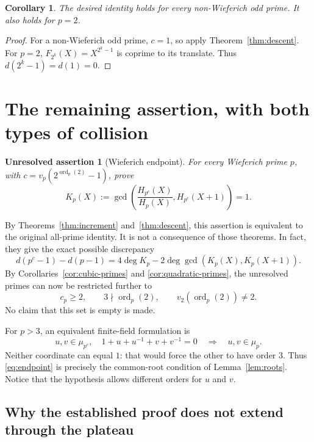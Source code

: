 \documentclass[a4paper]{article}
\newtheorem{corollary}[theorem]{Corollary}
\newtheorem{problem}[theorem]{Unresolved assertion}
\newcommand{\ord}{\operatorname{ord}}
\begin{document}
\begin{corollary}
The desired identity holds for every non-Wieferich odd prime.
It also holds for $p=2$.
\end{corollary}

\begin{proof}
For a non-Wieferich odd prime, $c=1$, so apply
Theorem~\ref{thm:descent}.
For $p=2$, $F_{2^k}(X)=X^{2^k-1}$ is coprime to its translate.
Thus $d(2^k-1)=d(1)=0$.
\end{proof}

\section{The remaining assertion, with both types of collision}

\begin{problem}[Wieferich endpoint]\label{prob:endpoint}
For every Wieferich prime $p$, with $c=v_p(2^{\ord_p(2)}-1)$, prove
\begin{equation}\label{eq:missing}
 K_p(X):=\gcd\!\left(
       \frac{H_{p^c}(X)}{H_p(X)},H_{p^c}(X+1)
       \right)=1.
\end{equation}
\end{problem}

By Theorems~\ref{thm:increment} and~\ref{thm:descent}, this assertion
is equivalent to the original all-prime identity.
It is not a consequence of those theorems.
In fact, they give the exact possible discrepancy
\[
 d(p^c-1)-d(p-1)
 =4\deg K_p-2\deg\gcd(K_p(X),K_p(X+1)).
\]
By Corollaries~\ref{cor:cubic-primes} and
\ref{cor:quadratic-primes}, the unresolved primes can now be
restricted further to
\begin{equation}\label{eq:remaining-primes}
 c_p\geq2,\qquad 3\nmid\ord_p(2),\qquad
 v_2(\ord_p(2))\ne2.
\end{equation}
No claim that this set is empty is made.

For $p>3$, an equivalent finite-field formulation is
\begin{equation}\label{eq:endpoint}
 u,v\in\mu_{p^c},\quad
 1+u+u^{-1}+v+v^{-1}=0
 \quad\Longrightarrow\quad u,v\in\mu_p.
\end{equation}
Neither coordinate can equal $1$: that would force the other to have
order $3$.
Thus \eqref{eq:endpoint} is precisely the common-root condition of
Lemma~\ref{lem:roots}.
Notice that the hypothesis allows different orders for $u$ and $v$.

\subsection{Why the established proof does not extend through the plateau}
\end{document}
